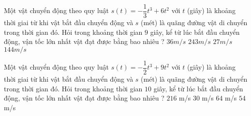 \begin{ex}%
    Một vật chuyển động theo quy luật $ s(t)=-\dfrac{1}{3}t^3+6t^2 $ với $ t $ (giây) là khoảng thời giai từ khi vật bắt đầu chuyển động và $ s $ (mét) là quãng đường vật di chuyển trong thời gian đó. Hỏi trong khoảng thời gian $ 9$ giây, kể từ lúc bắt đầu chuyển động, vận tốc lớn nhất vật đạt được bằng bao nhiêu ?
    \choice
    {\True$36 m/s$}
    {$243 m/s$}
    {$27 m/s$}
    {$144 m/s$}
\end{ex}
\begin{ex}%
    Một vật chuyển động theo quy luật $ s(t)=-\dfrac{1}{2}t^3+9t^2 $ với $ t $ (giây) là khoảng thời giai từ khi vật bắt đầu chuyển động và $ s $ (mét) là quãng đường vật di chuyển trong thời gian đó. Hỏi trong khoảng thời gian $ 10 $ giây, kể từ lúc bắt đầu chuyển động, vận tốc lớn nhất vật đạt được bằng bao nhiêu ?
    \choice
    {$216 $ m/s}
    {$30 $ m/s}
    {$64 $ m/s}
    {\True$54 $ m/s}
\end{ex}
